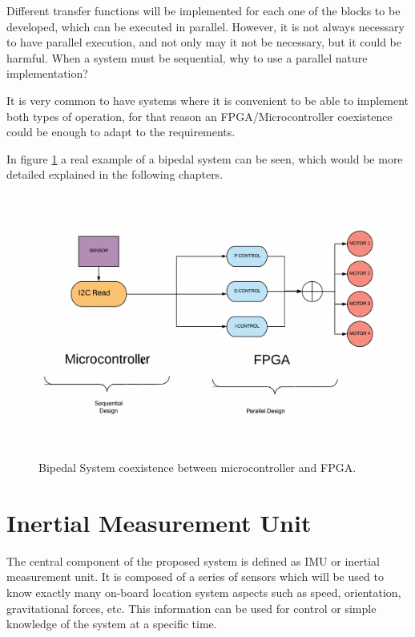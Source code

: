 Different transfer functions will be implemented for each one of the blocks to be developed, which can be executed in parallel.
However, it is not always necessary to have parallel execution, and not only may it not be necessary, but it could be harmful. When a system must be sequential, why to use a parallel nature implementation? \newline

It is very common to have systems where it is convenient to be able to implement both types of operation, for that reason an FPGA/Microcontroller coexistence could be enough to adapt to the requirements. \newline

In figure \ref{fig:bipedo} a real example of a bipedal system can be seen, which would be more detailed explained in the following chapters.

\begin{center}
	\begin{figure}[H]
		\center
		\includegraphics[scale=0.4]{imagenes/EstadoArte/bipedo.pdf}
		\caption{Bipedal System coexistence between microcontroller and FPGA.}
		\label{fig:bipedo}
	\end{figure}
\end{center}
\newpage
\section{Inertial Measurement Unit}\label{sec:IMU}
The central component of the proposed system is defined as IMU or inertial measurement unit. It is composed of a series of sensors which will be used to know exactly many on-board location system aspects such as speed, orientation, gravitational forces, etc. \newline
This information can be used for control or simple knowledge of the system at a specific time. \newline

